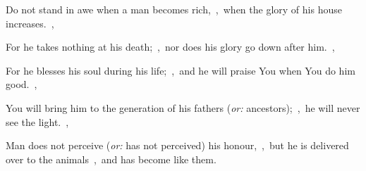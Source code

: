\documentclass[12pt,twoside,a5paper]{article}
\newcommand{\translationoption}[1]{\emph{or:} #1}
\begin{document}
\begin{normalparskip}
  Do not stand in awe when a man becomes rich,~\sep\ when the glory of his house increases.~\sep

  For he takes nothing at his death;~\sep\ nor does his glory go down after him.~\sep

  For he blesses his soul during his life;~\sep\ and he will praise You when You do him good.~\sep

  You will bring him to the generation of his fathers (\translationoption{ancestors});~\sep\ he will never see the light.~\sep

  Man does not perceive (\translationoption{has not perceived}) his honour,~\sep\ but he is delivered over to the animals~\sep\ and has become like them.
\end{normalparskip}
\end{document}

